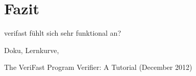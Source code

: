 ﻿\chapter{Fazit}

verifast fühlt sich sehr funktional an?

Doku, Lernkurve, 

\begin{thebibliography}{}
 The VeriFast Program Verifier: A Tutorial (December 2012)
\end{thebibliography}